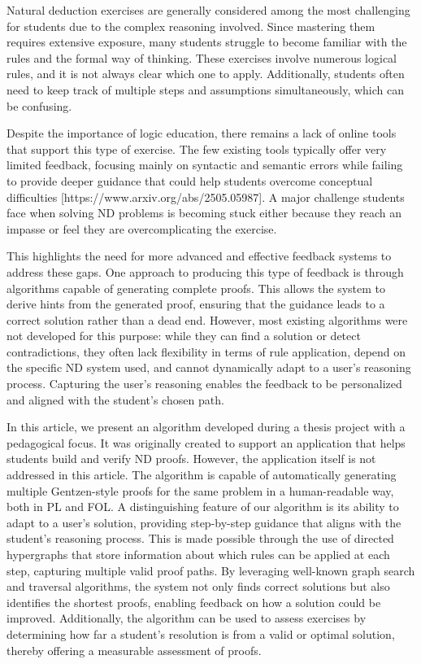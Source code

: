\documentclass[runningheads]{llncs}
\begin{document}
Natural deduction exercises are generally considered among the most challenging for students due to the complex reasoning involved. Since mastering them requires extensive exposure, many students struggle to become familiar with the rules and the formal way of thinking. These exercises involve numerous logical rules, and it is not always clear which one to apply. Additionally, students often need to keep track of multiple steps and assumptions simultaneously, which can be confusing.

Despite the importance of logic education, there remains a lack of online tools that support this type of exercise. The few existing tools typically offer very limited feedback, focusing mainly on syntactic and semantic errors while failing to provide deeper guidance that could help students overcome conceptual difficulties [https://www.arxiv.org/abs/2505.05987]. A major challenge students face when solving ND problems is becoming stuck either because they reach an impasse or feel they are overcomplicating the exercise.

This highlights the need for more advanced and effective feedback systems to address these gaps. One approach to producing this type of feedback is through algorithms capable of generating complete proofs. This allows the system to derive hints from the generated proof, ensuring that the guidance leads to a correct solution rather than a dead end. However, most existing algorithms were not developed for this purpose: while they can find a solution or detect contradictions, they often lack flexibility in terms of rule application, depend on the specific ND system used, and cannot dynamically adapt to a user’s reasoning process. Capturing the user’s reasoning enables the feedback to be personalized and aligned with the student’s chosen path.

In this article, we present an algorithm developed during a thesis project with a pedagogical focus. It was originally created to support an application that helps students build and verify ND proofs. However, the application itself is not addressed in this article.  The algorithm is capable of automatically generating multiple Gentzen-style proofs for the same problem in a human-readable way, both in PL and FOL. A distinguishing feature of our algorithm is its ability to adapt to a user’s solution, providing step-by-step guidance that aligns with the student’s reasoning process. This is made possible through the use of directed hypergraphs that store information about which rules can be applied at each step, capturing multiple valid proof paths. By leveraging well-known graph search and traversal algorithms, the system not only finds correct solutions but also identifies the shortest proofs, enabling feedback on how a solution could be improved. Additionally, the algorithm can be used to assess exercises by determining how far a student’s resolution is from a valid or optimal solution, thereby offering a measurable assessment of proofs.
\end{document}
